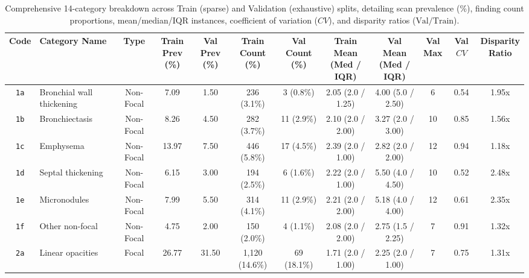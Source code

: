 \documentclass[11pt,a4paper]{article}
\begin{document}
\begin{table}[htbp]
\centering
\caption{Comprehensive 14-category breakdown across Train (sparse) and Validation (exhaustive) splits, detailing scan prevalence (\%), finding count proportions, mean/median/IQR instances, coefficient of variation ($CV$), and disparity ratios ($\text{Val}/\text{Train}$).}
\label{tab:category_breakdown}
\scriptsize
\setlength{\tabcolsep}{2.5pt}
\begin{tabularx}{\linewidth}{clcccccc cc cc}
\toprule
\textbf{Code} & \textbf{Category Name} & \textbf{Type} & \makecell{\textbf{Train}\\\textbf{Prev (\%)}} & \makecell{\textbf{Val}\\\textbf{Prev (\%)}} & \makecell{\textbf{Train}\\\textbf{Count (\%)}} & \makecell{\textbf{Val}\\\textbf{Count (\%)}} & \makecell{\textbf{Train Mean}\\\textbf{(Med / IQR)}} & \makecell{\textbf{Val Mean}\\\textbf{(Med / IQR)}} & \makecell{\textbf{Val}\\\textbf{Max}} & \makecell{\textbf{Val}\\\textbf{$CV$}} & \makecell{\textbf{Disparity}\\\textbf{Ratio}} \\
\midrule
\texttt{1a} & Bronchial wall thickening & Non-Focal & 7.09 & 1.50 & 236 (3.1\%) & 3 (0.8\%) & 2.05 (2.0 / 1.25) & 4.00 (5.0 / 2.50) & 6 & 0.54 & 1.95x \\
\texttt{1b} & Bronchiectasis           & Non-Focal & 8.26 & 4.50 & 282 (3.7\%) & 11 (2.9\%) & 2.10 (2.0 / 2.00) & 3.27 (2.0 / 3.00) & 10 & 0.85 & 1.56x \\
\texttt{1c} & Emphysema                & Non-Focal & 13.97 & 7.50 & 446 (5.8\%) & 17 (4.5\%) & 2.39 (2.0 / 1.00) & 2.82 (2.0 / 2.00) & 12 & 0.94 & 1.18x \\
\texttt{1d} & Septal thickening        & Non-Focal & 6.15 & 3.00 & 194 (2.5\%) & 6 (1.6\%) & 2.22 (2.0 / 1.00) & 5.50 (4.0 / 4.50) & 10 & 0.52 & 2.48x \\
\texttt{1e} & Micronodules             & Non-Focal & 7.99 & 5.50 & 314 (4.1\%) & 11 (2.9\%) & 2.21 (2.0 / 2.00) & 5.18 (4.0 / 4.00) & 12 & 0.61 & 2.35x \\
\texttt{1f} & Other non-focal          & Non-Focal & 4.75 & 2.00 & 150 (2.0\%) & 4 (1.1\%) & 2.08 (2.0 / 2.00) & 2.75 (1.5 / 2.25) & 7 & 0.91 & 1.32x \\
\midrule
\texttt{2a} & Linear opacities         & Focal & 26.77 & 31.50 & 1,120 (14.6\%) & 69 (18.1\%) & 1.71 (2.0 / 1.00) & 2.25 (2.0 / 1.00) & 7 & 0.75 & 1.31x \\

\end{tabularx}
\end{table}
\end{document}
